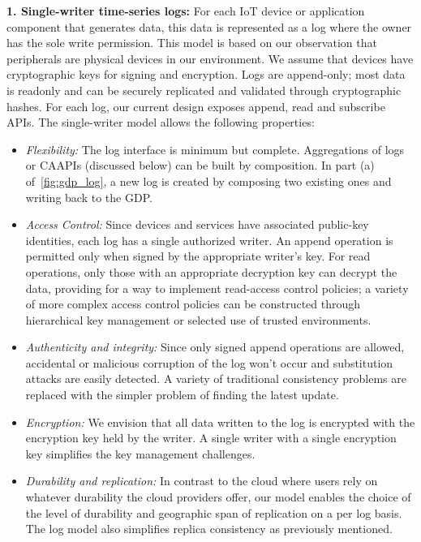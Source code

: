 \textbf{1. Single-writer time-series logs:} For each IoT device
or application component that generates data, this data is
represented as a log where the owner has the sole write
permission. This model is based on our observation that
peripherals are physical devices in our environment. We
assume that devices have cryptographic keys for signing
and encryption. Logs are append-only; most data is readonly
and can be securely replicated and validated through
cryptographic hashes.
For each log, our current design exposes append, read
and subscribe APIs. The single-writer model allows the
following properties:

\begin{itemize}
\item \textit{Flexibility:} The log interface is minimum but complete.
Aggregations of logs or CAAPIs (discussed below) can
be built by composition. In part (a) of~\autoref{fig:gdp_log}, a new log
is created by composing two existing ones and writing
back to the GDP.
\item \textit{Access Control:} Since devices and services have associated
public-key identities, each log has a single authorized
writer. An append operation is permitted only
when signed by the appropriate writer’s key. For read
operations, only those with an appropriate decryption key can decrypt the data, providing for a way to implement
read-access control policies; a variety of more
complex access control policies can be constructed
through hierarchical key management or selected use
of trusted environments.
\item \textit{Authenticity and integrity:} Since only signed append
operations are allowed, accidental or malicious corruption
of the log won’t occur and substitution attacks are
easily detected. A variety of traditional consistency
problems are replaced with the simpler problem of
finding the latest update.
\item \textit{Encryption:} We envision that all data written to the log
is encrypted with the encryption key held by the writer.
A single writer with a single encryption key simplifies
the key management challenges.
\item \textit{Durability and replication:} In contrast to the cloud
where users rely on whatever durability the cloud
providers offer, our model enables the choice of the
level of durability and geographic span of replication
on a per log basis. The log model also simplifies
replica consistency as previously mentioned.
\end{itemize}

